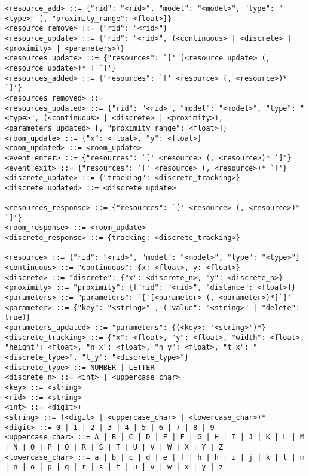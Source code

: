 \begin{lstlisting}[language={}]
<resource_add> ::= {"rid": "<rid>", "model": "<model>", "type": "<type>" [, "proximity_range": <float>]}
<resource_remove> ::= {"rid": "<rid>"}
<resource_update> ::= {"rid": "<rid>", (<continuous> | <discrete> | <proximity> | <parameters>)}
<resources_update> ::= {"resources": `[' [<resource_update> (, <resource_update>)* ] `]'}
<resources_added> ::= {"resources": `[' <resource> (, <resource>)* `]'}
<resources_removed> ::= 
<resources_updated> ::= {"rid": "<rid>", "model": "<model>", "type": "<type>", (<continuous> | <discrete> | <proximity>), <parameters_updated> [, "proximity_range": <float>]}
<room_update> ::= {"x": <float>, "y": <float>}
<room_updated> ::= <room_update>
<event_enter> ::= {"resources": `[' <resource> (, <resource>)* `]'}
<event_exit> ::= {"resources": `[' <resource> (, <resource>)* `]'}
<discrete_update> ::= {"tracking": <discrete_tracking>}
<discrete_updated> ::= <discrete_update>

<resources_response> ::= {"resources": `[' <resource> (, <resource>)* `]'}
<room_response> ::= <room_update>
<discrete_response> ::= {tracking: <discrete_tracking>}

<resource> ::= {"rid": "<rid>", "model": "<model>", "type": "<type>"}
<continuous> ::= "continuous": {x: <float>, y: <float>}
<discrete> ::= "discrete": {"x": <discrete_n>, "y": <discrete_n>}
<proximity> ::= "proximity": {["rid": "<rid>", "distance": <float>]}
<parameters> ::= "parameters": `['[<parameter> (, <parameter>)*]`]'
<parameter> ::= {"key": "<string>" , ("value": "<string>" | "delete": true)}
<parameters_updated> ::= "parameters": {(<key>: '<string>')*}
<discrete_tracking> ::= {"x": <float>, "y": <float>, "width": <float>, "height": <float>, "n_x": <float>, "n_y": <float>, "t_x": "<discrete_type>", "t_y": "<discrete_type>"}
<discrete_type> ::= NUMBER | LETTER
<discrete_n> ::= <int> | <uppercase_char>
<key> ::= <string>
<rid> ::= <string>
<int> ::= <digit>+
<string> ::= (<digit> | <uppercase_char> | <lowercase_char>)*
<digit> ::= 0 | 1 | 2 | 3 | 4 | 5 | 6 | 7 | 8 | 9
<uppercase_char> ::= A | B | C | D | E | F | G | H | I | J | K | L | M | N | O | P | Q | R | S | T | U | V | W | X | Y | Z
<lowercase_char> ::= a | b | c | d | e | f | h | h | i | j | k | l | m | n | o | p | q | r | s | t | u | v | w | x | y | z
\end{lstlisting}



